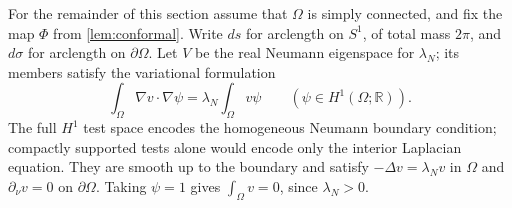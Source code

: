 For the remainder of this section assume that $\Omega$ is simply connected,
and fix the map $\Phi$ from \cref{lem:conformal}. Write $ds$ for
arclength on $S^1$, of total mass $2\pi$, and $d\sigma$ for arclength
on $\partial\Omega$. Let $V$ be the real Neumann eigenspace for
$\lambda_N$; its members satisfy the variational formulation
\begin{equation}\label{eq:V-weak}
 \int_\Omega\nabla v\cdot\nabla\psi
 =\lambda_N\int_\Omega v\psi
 \qquad(\psi\in H^1(\Omega;\mathbb R)).
\end{equation}
The full $H^1$ test space encodes the homogeneous Neumann boundary
condition; compactly supported tests alone would encode only the interior
Laplacian equation. They are smooth up to the boundary and satisfy
$-\Delta v=\lambda_Nv$ in $\Omega$ and $\partial_\nu v=0$ on
$\partial\Omega$. Taking $\psi=1$ gives $\int_\Omega v=0$, since
$\lambda_N>0$.

